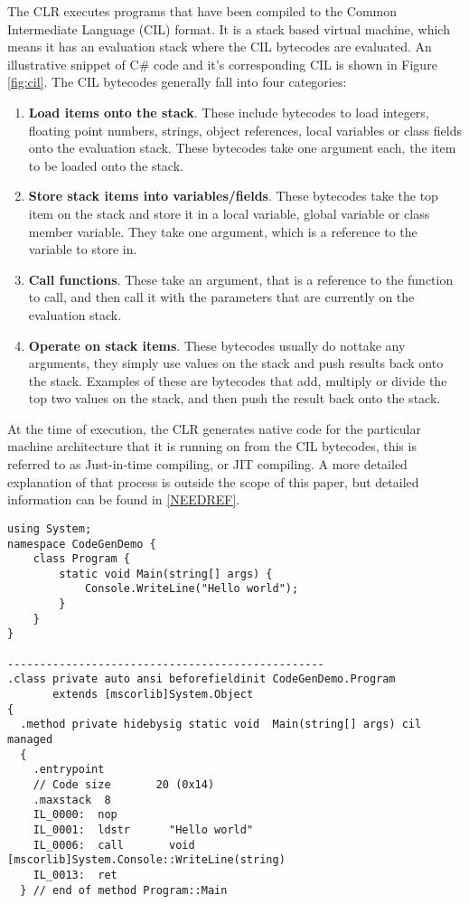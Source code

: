 	The CLR executes programs that have been compiled to the Common Intermediate 
	Language (CIL) format. It is a stack based virtual machine, which means it has
	an evaluation stack where the CIL bytecodes are evaluated. An illustrative 
	snippet of C\# code and it's corresponding CIL is shown in 
	Figure \ref{fig:cil}. The CIL bytecodes generally fall into four categories:
		
	\begin{enumerate}
		\item \textbf{Load items onto the stack}. These include bytecodes to load
		integers, floating point numbers, strings, object references, local variables
		or class fields onto the evaluation stack. These bytecodes take one argument
		each, the item to be loaded onto the stack.
		
		\item \textbf{Store stack items into variables/fields}. These bytecodes take
		the top item on the stack and store it in a local variable, global variable
		or class member variable. They take one argument, which is a reference to the
		variable to store in.
		
		\item \textbf{Call functions}. These take an argument, that is a reference to
		the function to call, and then call it with the parameters that are currently 
		on the evaluation stack.
			
		\item \textbf{Operate on stack items}. These bytecodes usually do nottake any
		arguments, they simply use values on the stack and push results back onto the 
		stack. Examples of these are bytecodes that add, multiply or divide the top 
		two values on the stack, and then push the result back onto the stack.
		
	\end{enumerate}
	
	At the time of execution, the CLR generates native code for the particular 
	machine architecture that it is running on from the CIL bytecodes, this is 
	referred to as Just-in-time compiling, or JIT compiling. A more detailed 
	explanation of that process is outside the scope of this paper, but detailed
	information can be found in \ref{NEEDREF}.
	
\lstset{language=CSharp}
\lstset{commentstyle=\textit}
\begin{lstlisting}[frame=trbl]
using System;
namespace CodeGenDemo {
    class Program {
        static void Main(string[] args) {
            Console.WriteLine("Hello world");
        }
    }
}

-------------------------------------------------
.class private auto ansi beforefieldinit CodeGenDemo.Program
       extends [mscorlib]System.Object
{
  .method private hidebysig static void  Main(string[] args) cil managed
  {
    .entrypoint
    // Code size       20 (0x14)
    .maxstack  8
    IL_0000:  nop
    IL_0001:  ldstr      "Hello world"
    IL_0006:  call       void [mscorlib]System.Console::WriteLine(string)
    IL_0013:  ret
  } // end of method Program::Main
\end{lstlisting}
  
